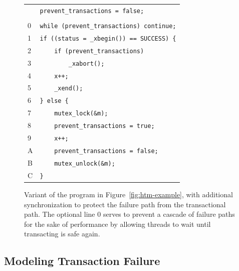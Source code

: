 \documentclass[10pt]{sigplanconf}
\begin{document}
\begin{figure}[t]
	\begin{center}
		\begin{tabular}{ll}
		  & \texttt{prevent\_transactions = false;} \\
		\\
		0 & \texttt{while (prevent\_transactions) continue;} \\
		1 & \texttt{if ((status = \_xbegin()) == SUCCESS) \{} \\
		2 & \texttt{~~~~if (prevent\_transactions)} \\
		3 & \texttt{~~~~~~~~\_xabort();} \\
		4 & \texttt{~~~~x++;} \\
		5 & \texttt{~~~~\_xend();} \\
		6 & \texttt{\} else \{} \\
		7 & \texttt{~~~~mutex\_lock(\&m);} \\
		8 & \texttt{~~~~prevent\_transactions = true;} \\
		9 & \texttt{~~~~x++;} \\
		A & \texttt{~~~~prevent\_transactions = false;} \\
		B & \texttt{~~~~mutex\_unlock(\&m);} \\
		C & \texttt{\}} \\
		\end{tabular}
	\end{center}
	\caption{Variant of the program in Figure~\ref{fig:htm-example},
		with additional synchronization to protect the failure path from the transactional path.
		The optional line 0 serves to prevent a cascade of failure paths
		for the sake of performance
		by allowing threads to wait until transacting is safe again.}
	\label{fig:htm-fixed}
\end{figure}

\subsection{Modeling Transaction Failure}
\end{document}
